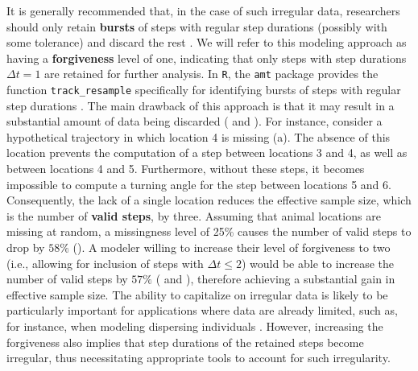 \documentclass[abstract=on,10pt,a4paper,bibliography=totocnumbered]{article}
\begin{document}
It is generally recommended that, in the case of such irregular data,
researchers should only retain \textbf{bursts} of steps with regular
step durations (possibly with some tolerance) and discard the rest
\citep{Thurfjell.2014}. We will refer to this modeling approach as having a
\textbf{forgiveness} level of one, indicating that only steps with
step durations $\Delta t = 1$ are retained for further analysis. In \texttt{R},
the \texttt{amt} package provides the function \texttt{track\_resample}
specifically for identifying bursts of steps with regular step durations
\citep{Signer.2019}. The main drawback of this approach is that it may result in
a substantial amount of data being discarded ( and
). For instance, consider a hypothetical trajectory in which
location 4 is missing (a). The absence of this location prevents
the computation of a step between locations 3 and 4, as well as between
locations 4 and 5. Furthermore, without these steps, it becomes impossible to
compute a turning angle for the step between locations 5 and 6. Consequently,
the lack of a single location reduces the effective sample size, which is the
number of \textbf{valid steps}, by three. Assuming that animal locations are
missing at random, a missingness level of 25\% causes the number of valid steps
to drop by $58\%$ (). A modeler willing to increase their
level of forgiveness to two (i.e., allowing for inclusion of steps with $\Delta
t \leq 2$) would be able to increase the number of valid steps by $57\%$
( and ), therefore achieving a substantial
gain in effective sample size. The ability to capitalize on irregular data is
likely to be particularly important for applications where data are already
limited, such as, for instance, when modeling dispersing individuals
\citep{Rudnick.2012, Fattebert.2015, Cozzi.2020}. However, increasing the
forgiveness also implies that step durations of the retained steps become
irregular, thus necessitating appropriate tools to account for such
irregularity.
\end{document}
